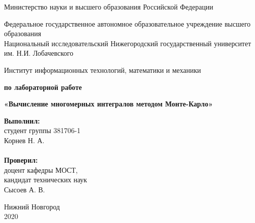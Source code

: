 \documentclass{report}
\begin{document}
\begin{titlepage}

\begin{center}
Министерство науки и высшего образования Российской Федерации
\end{center}

\begin{center}
Федеральное государственное автономное образовательное учреждение высшего образования \\
Национальный исследовательский Нижегородский государственный университет им. Н.И. Лобачевского
\end{center}

\begin{center}
Институт информационных технологий, математики и механики
\end{center}

\vspace{4em}

\begin{center}
\textbf{ по лабораторной работе} \\
\end{center}
\begin{center}
\textbf{\Large«Вычисление многомерных интегралов методом Монте-Карло»} \\
\end{center}

\vspace{4em}

\newbox{\lbox}
\newlength{\maxl}
\setlength{\maxl}{\wd\lbox}
\hfill\parbox{7cm}{
\hspace*{5cm}\hspace*{-5cm}\textbf{Выполнил:} \\ студент группы 381706-1 \\ Корнев Н. А.\\
\\
\hspace*{5cm}\hspace*{-5cm}\textbf{Проверил:}\\ доцент кафедры МОСТ, \\ кандидат технических наук \\ Сысоев А. В.
}

\vspace{\fill}

\begin{center} Нижний Новгород \\ 2020 \end{center}

\end{titlepage}
\end{document}
